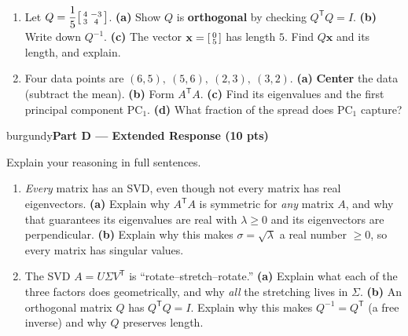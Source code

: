 \documentclass[10pt]{article}
\newcommand{\xx}{\mathbf{x}}
\newcommand{\vv}{\mathbf{v}}
\newcommand{\uu}{\mathbf{u}}
\newcommand{\T}{^{\mathsf T}}
\newcommand{\parthead}[1]{%
  \vspace{6pt}\noindent
  \begin{headlinebox}{burgundy}{\color{white}\bfseries #1}\end{headlinebox}%
  \vspace{4pt}}
\begin{document}
\begin{enumerate}[leftmargin=1.9em, itemsep=12pt]
        with $\uu_1=\vv_1=\tfrac{1}{\sqrt2}\begin{bsmallmatrix}1\\1\end{bsmallmatrix}$.
        \textbf{(a)} Build the best rank-one approximation $A_1=\sigma_1\uu_1\vv_1\T$.
        \textbf{(b)} What fraction of the \textbf{energy} does $A_1$ keep?
        \vspace{2.8cm}
  \item Let $Q=\dfrac15\begin{bsmallmatrix}4&-3\\3&4\end{bsmallmatrix}$.
        \textbf{(a)} Show $Q$ is \textbf{orthogonal} by checking $Q\T Q=I$.
        \textbf{(b)} Write down $Q^{-1}$.
        \textbf{(c)} The vector $\xx=\begin{bsmallmatrix}0\\5\end{bsmallmatrix}$ has length $5$. Find $Q\xx$ and its length, and explain.
        \vspace{2.8cm}
  \item Four data points are $(6,5),\ (5,6),\ (2,3),\ (3,2)$.
        \textbf{(a)} \textbf{Center} the data (subtract the mean). \textbf{(b)} Form $A\T A$.
        \textbf{(c)} Find its eigenvalues and the first principal component $\mathrm{PC}_1$.
        \textbf{(d)} What fraction of the spread does $\mathrm{PC}_1$ capture?
        \vspace{3.0cm}
\end{enumerate}

\parthead{Part D --- Extended Response (10 pts)}
Explain your reasoning in full sentences.

\begin{enumerate}[leftmargin=1.9em, itemsep=16pt]
  \item \emph{Every} matrix has an SVD, even though not every matrix has real eigenvectors.
        \textbf{(a)} Explain why $A\T A$ is symmetric for \emph{any} matrix $A$, and why that guarantees its
        eigenvalues are real with $\lambda\ge0$ and its eigenvectors are perpendicular.
        \textbf{(b)} Explain why this makes $\sigma=\sqrt{\lambda}$ a real number $\ge0$, so every matrix has singular values.
        \vspace{3.0cm}
  \item The SVD $A=U\Sigma V\T$ is ``rotate--stretch--rotate.''
        \textbf{(a)} Explain what each of the three factors does geometrically, and why \emph{all} the stretching lives in $\Sigma$.
        \textbf{(b)} An orthogonal matrix $Q$ has $Q\T Q=I$. Explain why this makes $Q^{-1}=Q\T$ (a free inverse) and why $Q$ preserves length.
        \vspace{2.8cm}
\end{enumerate}
\end{document}
